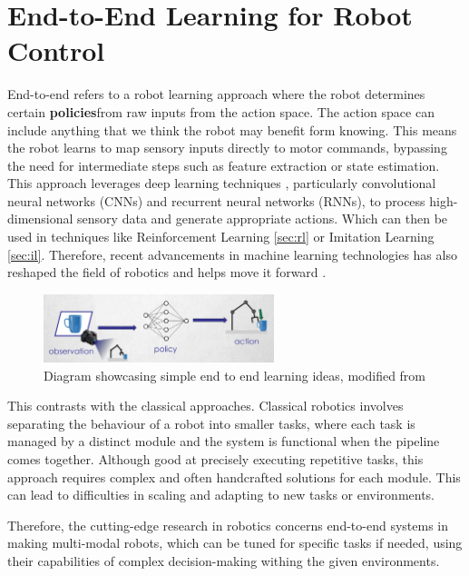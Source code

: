 \section{End-to-End Learning for Robot Control}

  End-to-end refers to a robot learning approach where the robot determines certain \textbf{policies}from raw inputs from the action space. The action space can include anything that we think the robot may benefit form knowing. This means the robot learns to map sensory inputs directly to motor commands, bypassing the need for intermediate steps such as feature extraction or state estimation. This approach leverages deep learning techniques \cite{Schmidhuber2015nn}, particularly convolutional neural networks (CNNs) and recurrent neural networks (RNNs), to process high-dimensional sensory data and generate appropriate actions. Which can then be used in techniques like Reinforcement Learning \ref{sec:rl} or Imitation Learning \ref{sec:il}. Therefore, recent advancements in machine learning technologies has also reshaped the field of robotics and helps move it forward \cite{Pierson18082017,newbury2023graspSynthReview,liu2021DRLminireview}.

  \begin{figure}[h]
    \centering
    \includegraphics[width=0.6\textwidth]{assets/intro/endtoend.png}
    \caption{Diagram showcasing simple end to end learning ideas, modified from \cite{johns2024}}\label{fig:end2end}
  \end{figure}

  This contrasts with the classical approaches. Classical robotics involves separating the behaviour of a robot into smaller tasks, where each task is managed by a distinct module and the system is functional when the pipeline comes together. Although good at precisely executing repetitive tasks, this approach requires complex and often handcrafted solutions for each module. This can lead to difficulties in scaling and adapting to new tasks or environments. 
  
  Therefore, the cutting-edge research in robotics concerns end-to-end systems in making multi-modal robots, which can be tuned for specific tasks if needed, using their capabilities of complex decision-making withing the given environments.






